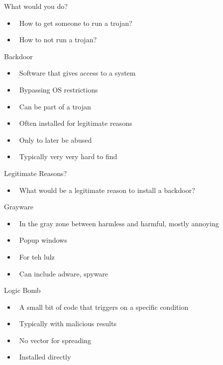 \documentclass{beamer}
\begin{document}
\begin{frame}{What would you do?}
  \begin{itemize}
  \item  How to get someone to run a trojan? 
  \item  How to not run a trojan?
  \end{itemize}
\end{frame}

\begin{frame}{Backdoor}
  \begin{itemize}
  \item  Software that gives access to a system 
  \item  Bypassing OS restrictions 
  \item  Can be part of a trojan 
  \item  Often installed for legitimate reasons 
  \item  Only to later be abused 
  \item  Typically very very hard to find
  \end{itemize}
\end{frame}

\begin{frame}{Legitimate Reasons?}
  \begin{itemize}
  \item  What would be a legitimate reason to install a 
backdoor?  
  \end{itemize}
\end{frame}
 
\begin{frame}{Grayware}
  \begin{itemize}
  \item  In the gray zone between harmless and 
    harmful, mostly annoying 
  \item  Popup windows 
  \item  For teh lulz 
  \item  Can include adware, spyware
  \end{itemize}
\end{frame}

\begin{frame}{Logic Bomb }
  \begin{itemize}
  \item  A small bit of code that triggers on a specific 
    condition 
  \item  Typically with malicious results 
  \item  No vector for spreading 
  \item  Installed directly
  \end{itemize}
\end{frame}
\end{document}
